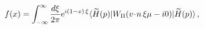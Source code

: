 \begin{equation}
\label{LargeX}
f (x)
=
\int_{-\infty}^\infty \frac{d \xi}{2 \pi}
{\rm e}^{i(1 - x) \, \xi}
\langle \widetilde{H}(p) |
W_{\scriptstyle\Pi} ( {v \!\cdot\! n} \, \xi \mu -i0) | \widetilde{H}(p) \rangle
\, ,
\end{equation}

